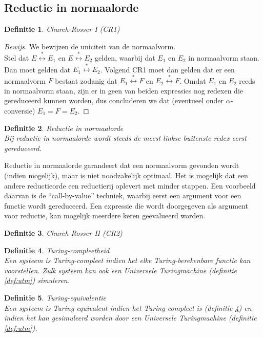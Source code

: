 \documentclass[a4paper]{article}
\newtheorem{tdefinitie}{Definitie}[section]
\newenvironment{definitie}[1]%
  {\begin{mdframed}[backgroundcolor=silver,
    topline=false,
    rightline=false,
    leftline=false,
    bottomline=false]\begin{tdefinitie}#1\\\normalfont}%
  {\end{tdefinitie}\end{mdframed}}
\newenvironment{bewijs}[1]%
  {\begin{mdframed}[topline=true,
    rightline=true,
    leftline=true,
    bottomline=true]\begin{proof}[Bewijs]#1\\[.2cm]\normalfont}%
  {\end{proof}\end{mdframed}}
\begin{document}
\subsection{Reductie in normaalorde}

\begin{definitie}{Church-Rosser I (CR1)}
  
\end{definitie}

\begin{bewijs}{We bewijzen de uniciteit van de normaalvorm.}
  Stel dat $E \stackrel{*}{\longleftrightarrow} E_1$ en $E \stackrel{*}{\longleftrightarrow} E_2$ gelden, waarbij dat $E_1$ en $E_2$ in normaalvorm staan. Dan moet gelden dat $E_1 \stackrel{*}{\longleftrightarrow} E_2$. Volgend CR1 moet dan gelden dat er een normaalvorm $F$ bestaat zodanig dat $E_1 \stackrel{*}{\longleftrightarrow} F$ en $E_2 \stackrel{*}{\longleftrightarrow} F$. Omdat $E_1$ en $E_2$ reeds in normaalvorm staan, zijn er in geen van beiden expressies nog redexen die gereduceerd kunnen worden, dus concluderen we dat (eventueel onder $\alpha$-conversie) $E_1 = F = E_2$.
\end{bewijs}

\begin{definitie}{Reductie in normaalorde}
Bij reductie in normaalorde wordt steeds de meest linkse buitenste redex eerst gereduceerd.
\end{definitie}

Reductie in normaalorde garandeert dat een normaalvorm gevonden wordt (indien mogelijk), maar is niet noodzakelijk optimaal. Het is mogelijk dat een andere reductieorde een reductierij oplevert met minder stappen. Een voorbeeld daarvan is de ``call-by-value'' techniek, waarbij eerst een argument voor een functie wordt gereduceerd. Een expressie die wordt doorgegeven als argument voor reductie, kan mogelijk meerdere keren ge\"evalueerd worden.

\begin{definitie}{Church-Rosser II (CR2)}
  
\end{definitie}

\begin{definitie}{Turing-compleetheid}
  \label{def:tmcompleet}
  Een systeem is Turing-compleet indien het elke Turing-berekenbare functie kan voorstellen. Zulk systeem kan ook een Universele Turingmachine (definitie \ref{def:utm}) simuleren.
\end{definitie}

\begin{definitie}{Turing-equivalentie}
  Een systeem is Turing-equivalent indien het Turing-compleet is (definitie \ref{def:tmcompleet}) en indien het kan gesimuleerd worden door een Universele Turingmachine (definitie \ref{def:utm}).
\end{definitie}
\end{document}
